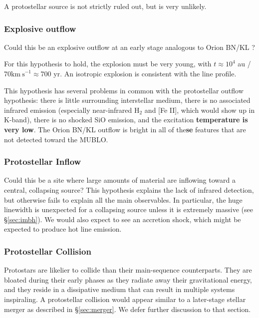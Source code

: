 \documentclass[]{aastex631}
\newcommand{\kms}{\ensuremath{\mathrm{km~s}^{-1}}\xspace}
\def\rr#1{\textbf{#1}}
\begin{document}
A protostellar source is not strictly ruled out, but is very unlikely.

\subsubsection{Explosive outflow}
\label{sec:explosion}
Could this be an explosive outflow at an early stage analogous to Orion BN/KL \citep[e.g.,][]{Bally2015,Bally2017}?

For this hypothesis to hold, the explosion must be very young, with $t\approx 10^4$ au / 70\kms$\approx$700 yr.
An isotropic explosion is consistent with the line profile.

This hypothesis has several problems in common with the protostellar outflow hypothesis: there is little surrounding interstellar medium, there is no associated infrared emission (especially near-infrared H$_2$ and [Fe II], which would show up in K-band), there is no shocked SiO emission, and the excitation \rr{temperature is very low}.
The Orion BN/KL outflow is bright in all of the\rr{se} features that are not detected toward the MUBLO.


\subsubsection{Protostellar Inflow}
\label{sec:inflow}
Could this be a site where large amounts of material are inflowing toward a central, collapsing source?
This hypothesis explains the lack of infrared detection, but otherwise fails to explain all the main observables.
In particular, the huge linewidth is unexpected for a collapsing source unless it is extremely massive (see \S \ref{sec:imbh}).
We would also expect to see an accretion shock, which might be expected to produce hot line emission.

\subsubsection{Protostellar Collision}
\label{sec:protostarcollision}

Protostars are likelier to collide than their main-sequence counterparts.
They are bloated during their early phases as they radiate away their gravitational energy, and they reside in a dissipative medium that can result in multiple systems inspiraling.
A protostellar collision would appear similar to a later-stage stellar merger as described in \S \ref{sec:merger}.
We defer further discussion to that section.
\end{document}
